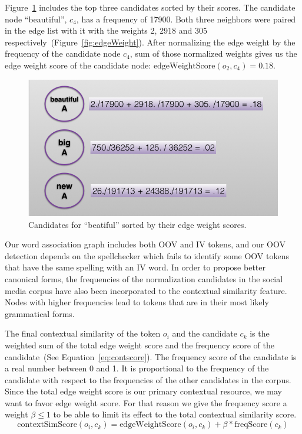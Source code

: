 \documentclass[a4paper,onesided,12pt]{report}
\begin{document}
Figure~\ref{fig:contextscores} includes the top three candidates sorted by their scores. The candidate node ``beautiful'', $c_4$, has a frequency of 17900. Both three neighbors were paired in the edge list with it with the weights 2, 2918 and 305 respectively~(Figure~\ref{fig:edgeWeight}). After normalizing the edge weight by the frequency of the candidate node  $c_4$, sum of those normalized weights gives us the edge weight score of the candidate node: $\text{edgeWeightScore}(o_2,c_4) = 0.18$.

\begin{figure}[htb]
\begin{center}
\includegraphics[scale=0.5]{fig/contextScores}
\caption{Candidates for ``beatiful'' sorted by their edge weight scores.}
\label{fig:contextscores}
\end{center}
\end{figure}

Our word association graph includes both OOV and IV tokens, and our OOV detection depends on the spellchecker which fails to identify some OOV tokens that have the same spelling with an IV word. In order to propose better canonical forms, the frequencies of the normalization candidates in the social media corpus have also been incorporated to the contextual similarity feature. Nodes with higher frequencies lead to tokens that are in their most likely grammatical forms.

The final contextual similarity of the token $o_i$ and the candidate $c_k$ is the weighted sum of the total edge weight score and the frequency score of the candidate~(See Equation~\ref{eq:contscore}). The frequency score of the candidate is a real number between 0 and 1. It is proportional to the frequency of the candidate with respect to the frequencies of the other candidates in the corpus. Since the total edge weight score is our primary contextual resource, we may want to favor edge weight score. For that reason we give the frequency score a weight $\beta \leq 1$ to be able to limit its effect to the total contextual similarity score.
\begin{equation}
\text{contextSimScore}(o_i,c_k) = \text{edgeWeightScore}(o_i,c_k) + \beta * \text{freqScore}(c_k)
\label{eq:contscore}
\end{equation}
\end{document}
